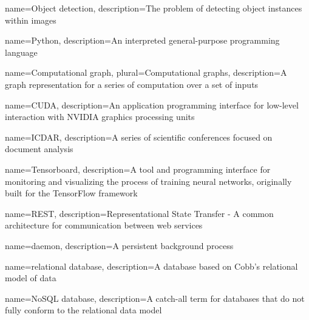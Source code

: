 {
    name={Object detection},
    description={The problem of detecting object instances within images}
}

{
    name={Python},
    description={An interpreted general-purpose programming language}
}

{
    name={Computational graph},
    plural={Computational graphs},
    description={A graph representation for a series of computation over a set of inputs}
}

{
    name={CUDA},
    description={An application programming interface for low-level interaction with NVIDIA graphics processing units}
}

{
    name={ICDAR},
    description={A series of scientific conferences focused on document analysis}
}

{
    name={Tensorboard},
    description={A tool and programming interface for monitoring and visualizing the process of training neural networks, originally built for the TensorFlow framework}
}

{
    name={REST},
    description={Representational State Transfer - A common architecture for communication between web services}
}

{
    name={daemon},
    description={A persistent background process}
}

{
    name={relational database},
    description={A database based on Cobb's relational model of data}
}

{
    name={NoSQL database},
    description={A catch-all term for databases that do not fully conform to the relational data model}
}

